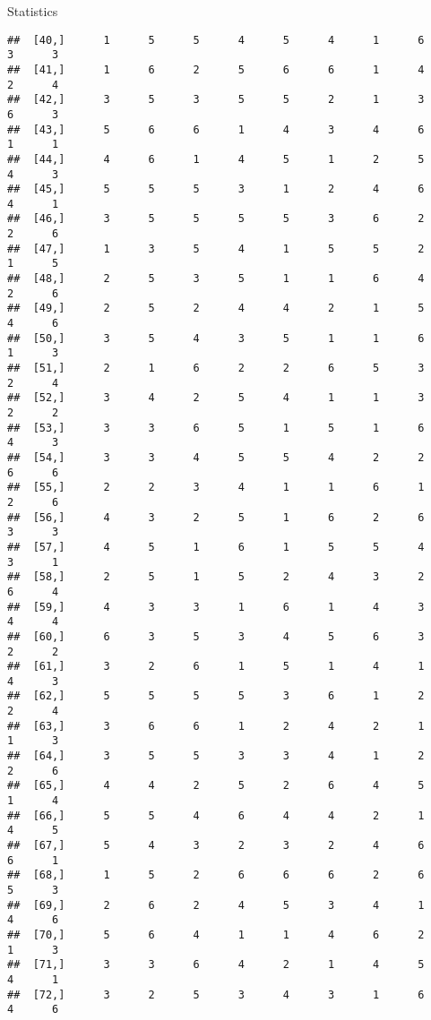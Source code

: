 \documentclass[
  ignorenonframetext,
]{beamer}
\begin{document}
\begin{frame}[fragile]{Statistics}
\begin{verbatim}
##  [40,]      1      5      5      4      5      4      1      6      3      3
##  [41,]      1      6      2      5      6      6      1      4      2      4
##  [42,]      3      5      3      5      5      2      1      3      6      3
##  [43,]      5      6      6      1      4      3      4      6      1      1
##  [44,]      4      6      1      4      5      1      2      5      4      3
##  [45,]      5      5      5      3      1      2      4      6      4      1
##  [46,]      3      5      5      5      5      3      6      2      2      6
##  [47,]      1      3      5      4      1      5      5      2      1      5
##  [48,]      2      5      3      5      1      1      6      4      2      6
##  [49,]      2      5      2      4      4      2      1      5      4      6
##  [50,]      3      5      4      3      5      1      1      6      1      3
##  [51,]      2      1      6      2      2      6      5      3      2      4
##  [52,]      3      4      2      5      4      1      1      3      2      2
##  [53,]      3      3      6      5      1      5      1      6      4      3
##  [54,]      3      3      4      5      5      4      2      2      6      6
##  [55,]      2      2      3      4      1      1      6      1      2      6
##  [56,]      4      3      2      5      1      6      2      6      3      3
##  [57,]      4      5      1      6      1      5      5      4      3      1
##  [58,]      2      5      1      5      2      4      3      2      6      4
##  [59,]      4      3      3      1      6      1      4      3      4      4
##  [60,]      6      3      5      3      4      5      6      3      2      2
##  [61,]      3      2      6      1      5      1      4      1      4      3
##  [62,]      5      5      5      5      3      6      1      2      2      4
##  [63,]      3      6      6      1      2      4      2      1      1      3
##  [64,]      3      5      5      3      3      4      1      2      2      6
##  [65,]      4      4      2      5      2      6      4      5      1      4
##  [66,]      5      5      4      6      4      4      2      1      4      5
##  [67,]      5      4      3      2      3      2      4      6      6      1
##  [68,]      1      5      2      6      6      6      2      6      5      3
##  [69,]      2      6      2      4      5      3      4      1      4      6
##  [70,]      5      6      4      1      1      4      6      2      1      3
##  [71,]      3      3      6      4      2      1      4      5      4      1
##  [72,]      3      2      5      3      4      3      1      6      4      6

\end{verbatim}
\end{frame}
\end{document}
